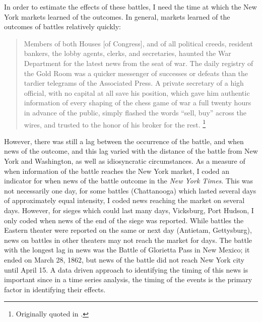 In order to estimate the effects of these battles, I need the time at which the New York markets learned of the outcomes.
In general, markets learned of the outcomes of battles relatively quickly:
\begin{quote}
Members of both Houses [of Congress], and of all political creeds, resident bankers, the lobby agents, clerks, and secretaries, haunted the War Department for the latest news from the seat of war.
The daily registry of the Gold Room was a quicker messenger of successes or defeats than the tardier telegrams of the Associated Press. A private secretary of a high official, with no capital at all save his position, which gave him authentic information of every shaping of the chess game of war a full twenty hours in advance of the public, simply flashed the words ``sell, buy'' across the wires, and trusted to the honor of his broker for the rest. \parencite[245]{Medbery1870a}\footnote{Originally quoted in \textcite{WillardGuinnaneEtAl1996}.}
\end{quote}
However, there was still a lag between the occurrence of the battle, and when news of the outcome, and this lag varied with the distance of the battle from New York and Washington, as well as idiosyncratic circumstances.
As a measure of when information of the battle reaches the New York market, I coded an indicator for when news of the battle outcome in the \textit{New York Times}.%
This was not necessarily one day, for some battles (Chattanooga) which lasted several days of approximately equal intensity, I coded news reaching the market on several days.
However, for sieges which could last many days, \eg{} Vicksburg, Port Hudson, I only coded when news of the end of the siege was reported.
While battles the Eastern theater were reported on the same or next day (Antietam, Gettysburg), news on battles in other theaters may not reach the market for days.
The battle with the longest lag in news was the Battle of Glorietta Pass in New Mexico; it ended on March 28, 1862, but news of the battle did not reach New York city until April 15.
A data driven approach to identifying the timing of this news is important since in a time series analysis, the timing of the events is the primary factor in identifying their effects.

